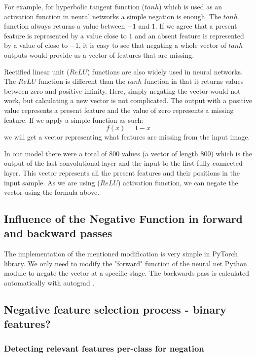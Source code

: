 \documentclass[b5paper]{book}
\let\cite\parencite
\begin{document}
For example, for hyperbolic tangent function (\(tanh\)) which is used as an activation function in neural networks a simple negation is enough. The \(tanh\) function always returns a value between \(-1\) and \(1\). If we agree that a present feature is represented by a value close to \(1\) and an absent feature is represented by a value of close to \(-1\), it is easy to see that negating a whole vector of \(tanh\) outputs would provide us a vector of features that are missing.

Rectified linear unit (\(ReLU\)) \cite{maas2013rectifier} functions are also widely used in neural networks. The \(ReLU\) function is different than the \(tanh\) function in that it returns values between zero and positive infinity. Here, simply negating the vector would not work, but calculating a new vector is not complicated. The output with a positive value represents a present feature and the value of zero represents a missing feature. If we apply a simple function as such:
%
\[
    f(x) = 1 - x
\]
%
we will get a vector representing what features are missing from the input image. 

In our model there were a total of 800 values (a vector of length 800) which is the output of the last convolutional layer and the input to the first fully connected layer. This vector represents all the present features and their positions in the input sample. As we are using (\(ReLU\)) activation function, we can negate the vector using the formula above.

\subsection{Influence of the Negative Function in forward and backward passes}

The implementation of the mentioned modification is very simple in PyTorch library. We only need to modify the "forward" function of the neural net Python module to negate the vector at a specific stage. The backwards pass is calculated automatically with autograd \cite{paszke2017automatic}.

\subsection{Negative feature selection process - binary features?}



\subsubsection{Detecting relevant features per-class for negation}
\end{document}
